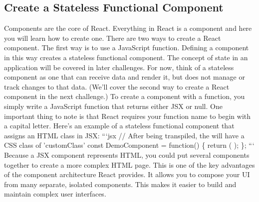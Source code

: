 \documentclass{article}%
\begin{document}
%
\subsection{Create a Stateless Functional Component}%
\label{subsec:CreateaStatelessFunctionalComponent}%
Components are the core of React. Everything in React is a component and here you will learn how to create one.\newline%
There are two ways to create a React component. The first way is to use a JavaScript function. Defining a component in this way creates a stateless functional component. The concept of state in an application will be covered in later challenges. For now, think of a stateless component as one that can receive data and render it, but does not manage or track changes to that data. (We'll cover the second way to create a React component in the next challenge.)\newline%
To create a component with a function, you simply write a JavaScript function that returns either JSX or null. One important thing to note is that React requires your function name to begin with a capital letter. Here's an example of a stateless functional component that assigns an HTML class in JSX:\newline%
```jsx\newline%
// After being transpiled, the  will have a CSS class of 'customClass'\newline%
const DemoComponent = function() \{\newline%
  return (\newline%
    \newline%
  );\newline%
\};\newline%
```\newline%
Because a JSX component represents HTML, you could put several components together to create a more complex HTML page. This is one of the key advantages of the component architecture React provides. It allows you to compose your UI from many separate, isolated components. This makes it easier to build and maintain complex user interfaces.\newline%

%
\end{document}

